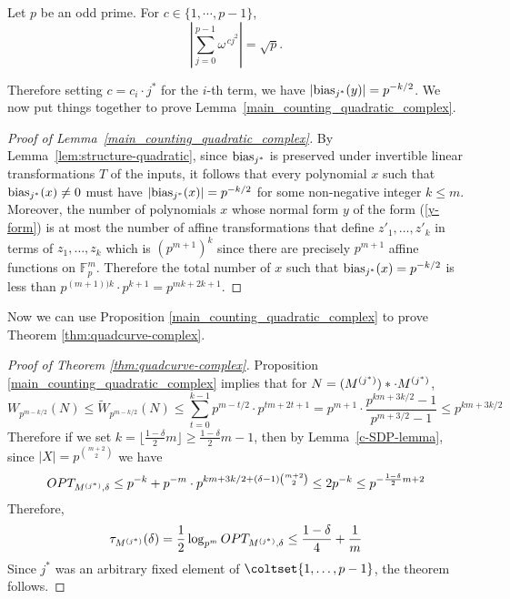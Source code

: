 \begin{proposition}
Let $p$ be an odd prime.
For $c\in \{1,\cdots,p-1\}$,
\[
|\sum_{j=0}^{p-1}\omega^{\,cj^2}|=\sqrt{p}.
\]
\end{proposition}

Therefore setting $c=c_i\cdot j^*$ for the $i$-th term, we have $|\mathrm{bias}_{j^*}(y)|=p^{-k/2}$.  We now put things together to
prove Lemma~\ref{main_counting_quadratic_complex}.

\begin{proof}[Proof of Lemma~\ref{main_counting_quadratic_complex}]
By Lemma~\ref{lem:structure-quadratic}, since $\mathrm{bias}_{j^*}$ is preserved under
invertible linear transformations $T$ of the inputs, 
it follows that every polynomial $x$ such that $\mathrm{bias}_{j^*}(x)\ne 0$ must have
$|\mathrm{bias}_{j^*}(x)|=p^{-k/2}$ for some non-negative integer $k\le m$.  
Moreover, the number of polynomials $x$ whose normal form $y$ of the form
(\ref{y-form})
is at most
the number of affine transformations that define $z'_1,\ldots,z'_k$ in
terms of $z_1,\ldots,z_k$ which is $(p^{m+1})^k$ since there are precisely
$p^{m+1}$ affine functions on $\mathbb{F}_p^m$. 
Therefore the total number of $x$ such that $\mathrm{bias}_{j^*}(x)=p^{-k/2}$ is less than 
$p^{(m+1))k}\cdot p^{k+1}=p^{mk+2k+1}$.
\end{proof}

Now we can use Proposition \ref{main_counting_quadratic_complex} to prove Theorem \ref{thm:quadcurve-complex}.

\begin{proof}[Proof of Theorem \ref{thm:quadcurve-complex}]
Proposition \ref{main_counting_quadratic_complex} implies that
for $N=(M^{(j^*)})*\cdot M^{(j^*)}$,
\[
W_{p^{m-k/2}}(N)\leq \tilde W_{p^{m-k/2}}(N)\leq \sum_{t=0}^{k-1}p^{m-t/2}\cdot p^{tm+2t+1}=p^{m+1}\cdot \frac{p^{km+3k/2}-1}{p^{m+3/2}-1}\leq p^{km+3k/2}
\]
Therefore if we set $k=\lfloor \frac {1-\delta} 2 m\rfloor\geq \frac {1-\delta} 2 m-1$,
then by Lemma~\ref{c-SDP-lemma}, since $|X|=p^{\binom{m+2}2}$
we have
\[
OPT_{M^{(j^*)},\delta}\leq p^{-k}+p^{-m}\cdot p^{km+3k/2+(\delta-1) \binom{m+2}2}\leq 2p^{-k}\leq p^{-\frac {1-\delta} 2 m+2}
\]
Therefore, 
\[
\tau_{M^{(j^*)}}(\delta)=\frac 1 2\log_{p^m}OPT_{M^{(j^*)},\delta}\leq \frac {1-\delta}4+\frac 1 m
\]
Since $j^*$ was an arbitrary fixed element of $\coltset{1,\ldots,p-1}$, the 
theorem follows.
\end{proof}
